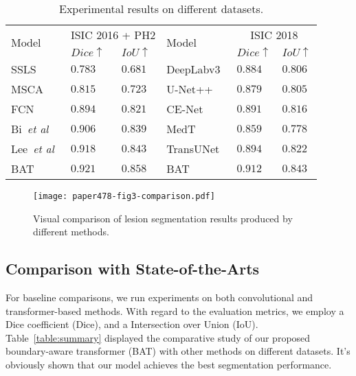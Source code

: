\documentclass[runningheads]{paper478-llncs}
\begin{document}
\begin{table*}[t]
    \caption{Experimental results on different datasets.}\label{table:summary}
\centering
\renewcommand\arraystretch{1.2}
\begin{tabular}{p{2cm}<{\centering}p{1.5cm}<{\centering}p{1.5cm}<{\centering}p{2cm}<{\centering}p{1.5cm}<{\centering}p{1.5cm}<{\centering}}
\hline
\hline
\multirow{2}{*}{Model} & \multicolumn{2}{c}{ISIC 2016 + PH2} & \multirow{2}{*}{Model} & \multicolumn{2}{c}{ISIC 2018}\\
 & $Dice\uparrow$ & $IoU\uparrow$ &  & $Dice\uparrow$ & $IoU\uparrow$ \\
\hline
SSLS\cite{ahn2015automated}  & $0.783$& $0.681$ & DeepLabv3~\cite{chen2017rethinking} & $0.884$& $0.806$\\
MSCA\cite{bi2016automated}  & $0.815$& $0.723$ & U-Net++~\cite{zhou2018unetpp} & $0.879$& $0.805$\\
FCN~\cite{long2015fully}   & $0.894$& $0.821$ & CE-Net~\cite{gu2019cenet} & $0.891$& $0.816$\\
Bi~\textit{et al}~\cite{7942129}  & $0.906$& $0.839$ & MedT~\cite{valanarasu2021medical} & $0.859$ & $0.778$\\
Lee~\textit{et al}~\cite{9157193}   & $0.918$& $0.843$ &TransUNet~\cite{chen2021transunet} & $0.894$& $0.822$\\
\hline
BAT & $0.921$& $0.858$ & BAT & $0.912$& $0.843$\\
\hline
\hline
\end{tabular}
\label{tab:results}
\end{table*}

\begin{figure}[t]
\centering
\texttt{[image: paper478-fig3-comparison.pdf]}
\caption{Visual comparison of lesion segmentation results produced by different methods.}
\label{fig:comparison_result}
\end{figure}



\subsection{Comparison with State-of-the-Arts}
For baseline comparisons, we run experiments on both convolutional and transformer-based methods.
With regard to the evaluation metrics, we employ a Dice coefficient (Dice), and a Intersection over Union (IoU). Table~\ref{table:summary} displayed the comparative study of our proposed boundary-aware transformer (BAT) with other methods on different datasets. It's obviously shown that our model achieves the best segmentation performance.
\end{document}
